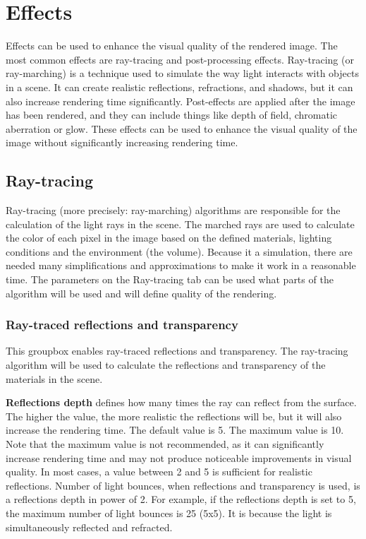 \section{Effects}\label{effects}

Effects can be used to enhance the visual quality of the rendered image. The most common effects are ray-tracing and post-processing effects. 
Ray-tracing (or ray-marching) is a technique used to simulate the way light interacts with objects in a scene. It can create realistic reflections, refractions, and shadows, but it can also increase rendering time significantly.
Post-effects are applied after the image has been rendered, and they can include things like depth of field, chromatic aberration or glow. These effects can be used to enhance the visual quality of the image without significantly increasing rendering time.

\subsection{Ray-tracing}\label{effects-ray-tracing}

Ray-tracing (more precisely: ray-marching) algorithms are responsible for the calculation of the light rays in the scene. The marched rays are used to calculate the color of each pixel in the image based on the defined materials, lighting conditions and the environment (the volume). Because it a simulation, there are needed many simplifications and approximations to make it work in a reasonable time. The parameters on the Ray-tracing tab can be used what parts of the algorithm will be used and will define quality of the rendering.

\subsubsection{Ray-traced reflections and transparency}\label{effects-ray-tracing-reflections}

This groupbox enables ray-traced reflections and transparency. The ray-tracing algorithm will be used to calculate the reflections and transparency of the materials in the scene. 

\textbf{Reflections depth} defines how many times the ray can reflect from the surface. The higher the value, the more realistic the reflections will be, but it will also increase the rendering time. The default value is 5. The maximum value is 10. Note that the maximum value is not recommended, as it can significantly increase rendering time and may not produce noticeable improvements in visual quality. In most cases, a value between 2 and 5 is sufficient for realistic reflections. Number of light bounces, when reflections and transparency is used, is a reflections depth in power of 2. For example, if the reflections depth is set to 5, the maximum number of light bounces is 25 (5x5). It is because the light is simultaneously reflected and refracted.

